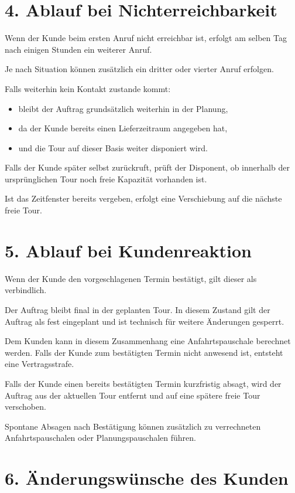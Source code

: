 \documentclass[a4paper,11pt]{article}
\begin{document}
	\section*{4. Ablauf bei Nichterreichbarkeit}
	
	Wenn der Kunde beim ersten Anruf nicht erreichbar ist, erfolgt am selben Tag
	nach einigen Stunden ein weiterer Anruf.
	
	Je nach Situation können zusätzlich ein dritter oder vierter Anruf erfolgen.
	
	Falls weiterhin kein Kontakt zustande kommt:
	
	\begin{itemize}
		\item bleibt der Auftrag grundsätzlich weiterhin in der Planung,
		\item da der Kunde bereits einen Lieferzeitraum angegeben hat,
		\item und die Tour auf dieser Basis weiter disponiert wird.
	\end{itemize}
	
	Falls der Kunde später selbst zurückruft, prüft der Disponent, ob innerhalb
	der ursprünglichen Tour noch freie Kapazität vorhanden ist.
	
	Ist das Zeitfenster bereits vergeben, erfolgt eine Verschiebung auf die nächste
	freie Tour.
	
	\section*{5. Ablauf bei Kundenreaktion}
	
	Wenn der Kunde den vorgeschlagenen Termin bestätigt, gilt dieser als verbindlich.
	
	Der Auftrag bleibt final in der geplanten Tour. In diesem Zustand gilt der
	Auftrag als fest eingeplant und ist technisch für weitere Änderungen gesperrt.
	
	Dem Kunden kann in diesem Zusammenhang eine Anfahrtspauschale berechnet werden.
	Falls der Kunde zum bestätigten Termin nicht anwesend ist, entsteht eine
	Vertragsstrafe.
	
	Falls der Kunde einen bereits bestätigten Termin kurzfristig absagt, wird der
	Auftrag aus der aktuellen Tour entfernt und auf eine spätere freie Tour
	verschoben.
	
	Spontane Absagen nach Bestätigung können zusätzlich zu verrechneten
	Anfahrtspauschalen oder Planungspauschalen führen.
	
	\section*{6. Änderungswünsche des Kunden}
	
\end{document}
